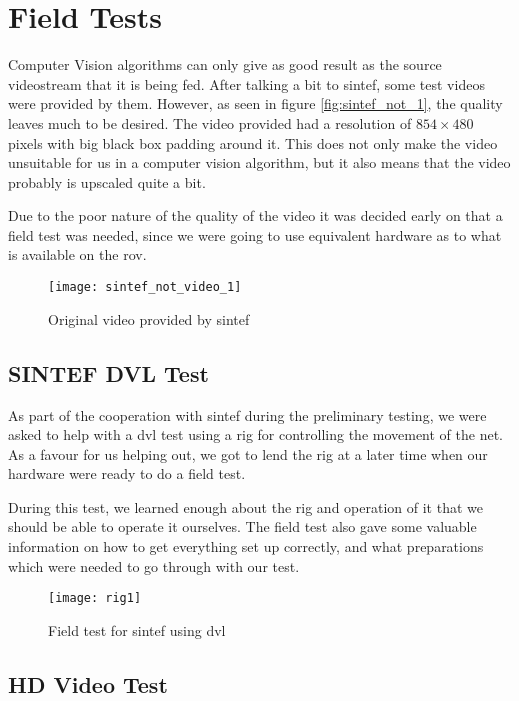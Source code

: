 
\chapter{Field Tests}\label{ch:field_test}

Computer Vision algorithms can only give as good result as the source videostream that it is 
being fed. After talking a bit to \gls{sintef}, some test videos were provided by them. However, as seen in figure 
\vref{fig:sintef_not_1}, the quality leaves much to be desired. The video provided had a resolution 
of $854 \times 480$ pixels with big black box padding around it. This does not only make 
the video unsuitable for us in a computer vision algorithm, but it also means that the video 
probably is upscaled quite a bit.

Due to the poor nature of the quality of the video it was decided early on that 
a field test was needed, since we were going to use equivalent hardware as to what is available on the \gls{rov}. 

\begin{figure}[htbp]
	\centering
	\texttt{[image: sintef\_not\_video\_1]}
	\caption{Original video provided by \gls{sintef}}
	\label{fig:sintef_not_1}
\end{figure}

\section{SINTEF DVL Test}\label{sec:sintef.test}
As part of the cooperation with \gls{sintef} during the preliminary testing, we 
were asked to help with a \gls{dvl} test using a rig for controlling 
the movement of the net. As a favour for us helping out, we 
got to lend the rig at a later time when our hardware were ready to do a field test. 

During this test, we learned enough about the rig and operation of it that we should be able to operate 
it ourselves. The field test also gave some valuable information 
on how to get everything set up correctly, and what preparations which 
were needed to go through with our test.

\begin{figure}[htbp]
	\centering
	\texttt{[image: rig1]}
	\caption{Field test for \gls{sintef} using \gls{dvl}}
	\label{fig:test_dvl}
\end{figure}

\section{HD Video Test}


